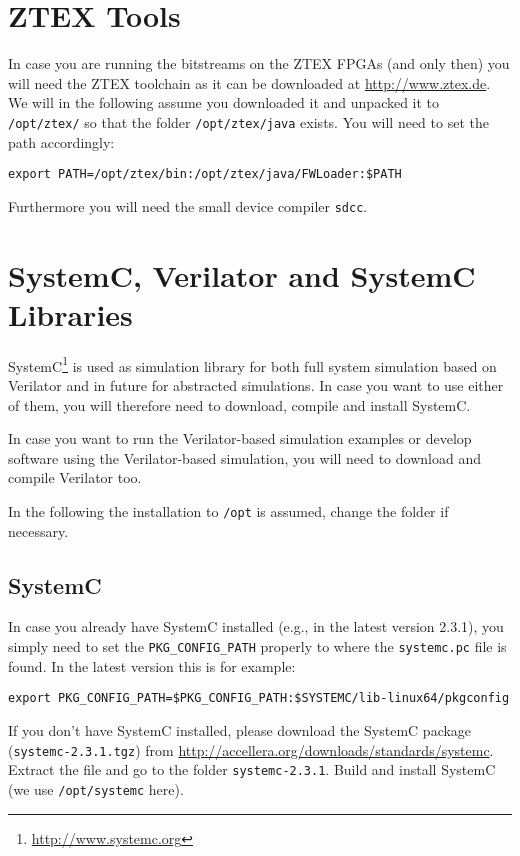 \section{ZTEX Tools}

In case you are running the bitstreams on the ZTEX FPGAs (and only
then) you will need the ZTEX toolchain as it can be downloaded at
\url{http://www.ztex.de}. We will in the following assume you
downloaded it and unpacked it to \verb|/opt/ztex/| so that the folder
\verb|/opt/ztex/java| exists. You will need to set the path
accordingly:

\begin{lstlisting}
export PATH=/opt/ztex/bin:/opt/ztex/java/FWLoader:$PATH
\end{lstlisting}

Furthermore you will need the small device compiler \verb|sdcc|.

\section{SystemC, Verilator and SystemC Libraries}

SystemC\footnote{\url{http://www.systemc.org}} is used as simulation
library for both full system simulation based on Verilator and in
future for abstracted simulations. In case you want to use either of
them, you will therefore need to download, compile and install
SystemC.

In case you want to run the Verilator-based simulation examples or
develop software using the Verilator-based simulation, you will need
to download and compile Verilator too.

In the following the installation to \verb|/opt| is assumed, change
the folder if necessary.

\subsection{SystemC}

In case you already have SystemC installed (e.g., in the latest
version 2.3.1), you simply need to set the \verb|PKG_CONFIG_PATH|
properly to where the \verb|systemc.pc| file is found. In the latest
version this is for example:

\begin{lstlisting}
export PKG_CONFIG_PATH=$PKG_CONFIG_PATH:$SYSTEMC/lib-linux64/pkgconfig
\end{lstlisting}

If you don't have SystemC installed, please download the SystemC
package (\verb|systemc-2.3.1.tgz|) from
\url{http://accellera.org/downloads/standards/systemc}. Extract the
file and go to the folder \texttt{systemc-2.3.1}. Build and install
SystemC (we use \texttt{/opt/systemc} here).

